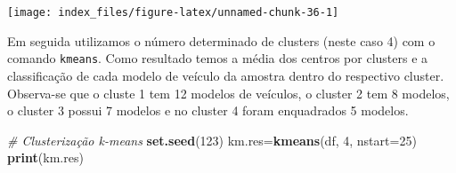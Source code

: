 \documentclass[12pt,brazil,oneside]{book}
\newenvironment{Shaded}{\begin{snugshade}}{\end{snugshade}}
\newcommand{\CommentTok}[1]{\textcolor[rgb]{0.56,0.35,0.01}{\textit{#1}}}
\newcommand{\DataTypeTok}[1]{\textcolor[rgb]{0.13,0.29,0.53}{#1}}
\newcommand{\DecValTok}[1]{\textcolor[rgb]{0.00,0.00,0.81}{#1}}
\newcommand{\KeywordTok}[1]{\textcolor[rgb]{0.13,0.29,0.53}{\textbf{#1}}}
\newcommand{\NormalTok}[1]{#1}
\begin{document}
\begin{center}\texttt{[image: index\_files/figure-latex/unnamed-chunk-36-1]} \end{center}

Em seguida utilizamos o número determinado de clusters (neste caso 4) com o comando \texttt{kmeans}. Como resultado temos a média dos centros por clusters e a classificação de cada modelo de veículo da amostra dentro do respectivo cluster. Observa-se que o cluste 1 tem 12 modelos de veículos, o cluster 2 tem 8 modelos, o cluster 3 possui 7 modelos e no cluster 4 foram enquadrados 5 modelos.

\begin{Shaded}
\begin{Highlighting}[]
\CommentTok{# Clusterização k-means}
\KeywordTok{set.seed}\NormalTok{(}\DecValTok{123}\NormalTok{)}
\NormalTok{km.res=}\KeywordTok{kmeans}\NormalTok{(df, }\DecValTok{4}\NormalTok{, }\DataTypeTok{nstart=}\DecValTok{25}\NormalTok{)}
\KeywordTok{print}\NormalTok{(km.res)}
\end{Highlighting}
\end{Shaded}
\end{document}
